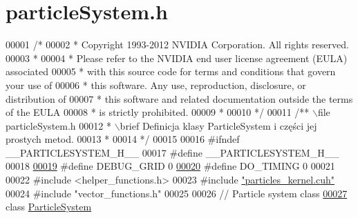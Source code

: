 \hypertarget{particle_system_8h_source}{\section{particle\-System.\-h}
}

\begin{DoxyCode}
00001 \textcolor{comment}{/*}
00002 \textcolor{comment}{ * Copyright 1993-2012 NVIDIA Corporation.  All rights reserved.}
00003 \textcolor{comment}{ *}
00004 \textcolor{comment}{ * Please refer to the NVIDIA end user license agreement (EULA) associated}
00005 \textcolor{comment}{ * with this source code for terms and conditions that govern your use of}
00006 \textcolor{comment}{ * this software. Any use, reproduction, disclosure, or distribution of}
00007 \textcolor{comment}{ * this software and related documentation outside the terms of the EULA}
00008 \textcolor{comment}{ * is strictly prohibited.}
00009 \textcolor{comment}{ *}
00010 \textcolor{comment}{ */}
00011   \textcolor{comment}{/** \(\backslash\)file particleSystem.h}
00012 \textcolor{comment}{  * \(\backslash\)brief Definicja klasy ParticleSystem i części jej prostych metod.}
00013 \textcolor{comment}{  *}
00014 \textcolor{comment}{  */}
00015 
00016 \textcolor{preprocessor}{#}\textcolor{preprocessor}{ifndef} \textcolor{preprocessor}{\_\_PARTICLESYSTEM\_H\_\_}
00017 \textcolor{preprocessor}{#}\textcolor{preprocessor}{define} \textcolor{preprocessor}{\_\_PARTICLESYSTEM\_H\_\_}
00018 
\hypertarget{particle_system_8h_source_l00019}{}\hyperlink{particle_system_8h_ae8e259f1517dc644367009cfc06caebe}{00019} \textcolor{preprocessor}{#}\textcolor{preprocessor}{define} \textcolor{preprocessor}{DEBUG\_GRID} 0
\hypertarget{particle_system_8h_source_l00020}{}\hyperlink{particle_system_8h_a55968a72af09a67a7420f59ee7435ea3}{00020} \textcolor{preprocessor}{#}\textcolor{preprocessor}{define} \textcolor{preprocessor}{DO\_TIMING} 0
00021 
00022 \textcolor{preprocessor}{#}\textcolor{preprocessor}{include} \textcolor{preprocessor}{<}\textcolor{preprocessor}{helper\_functions}\textcolor{preprocessor}{.}\textcolor{preprocessor}{h}\textcolor{preprocessor}{>}
00023 \textcolor{preprocessor}{#}\textcolor{preprocessor}{include} \hyperlink{particles__kernel_8cuh}{"particles\_kernel.cuh"}
00024 \textcolor{preprocessor}{#}\textcolor{preprocessor}{include} \textcolor{preprocessor}{"vector\_functions.h"}
00025 
00026 \textcolor{comment}{// Particle system class}
\hypertarget{particle_system_8h_source_l00027}{}\hyperlink{class_particle_system}{00027} \textcolor{keyword}{class} \hyperlink{class_particle_system}{ParticleSystem}

\end{DoxyCode}
